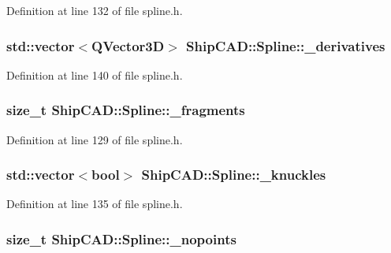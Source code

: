 Definition at line 132 of file spline.\-h.

\hypertarget{classShipCAD_1_1Spline_a8478f85abd680e3caee34dc230eed3e7}{
\subsubsection[{\-\_\-derivatives}]{\setlength{\rightskip}{0pt plus 5cm}std\-::vector$<$Q\-Vector3\-D$>$ Ship\-C\-A\-D\-::\-Spline\-::\-\_\-derivatives\hspace{0.3cm}{\ttfamily [protected]}}}\label{classShipCAD_1_1Spline_a8478f85abd680e3caee34dc230eed3e7}


Definition at line 140 of file spline.\-h.

\hypertarget{classShipCAD_1_1Spline_ac12e47ffb75b6d84877f849d18323622}{
\subsubsection[{\-\_\-fragments}]{\setlength{\rightskip}{0pt plus 5cm}size\-\_\-t Ship\-C\-A\-D\-::\-Spline\-::\-\_\-fragments\hspace{0.3cm}{\ttfamily [protected]}}}\label{classShipCAD_1_1Spline_ac12e47ffb75b6d84877f849d18323622}


Definition at line 129 of file spline.\-h.

\hypertarget{classShipCAD_1_1Spline_ac7d024ce90642d78587bc921efde009c}{
\subsubsection[{\-\_\-knuckles}]{\setlength{\rightskip}{0pt plus 5cm}std\-::vector$<$bool$>$ Ship\-C\-A\-D\-::\-Spline\-::\-\_\-knuckles\hspace{0.3cm}{\ttfamily [protected]}}}\label{classShipCAD_1_1Spline_ac7d024ce90642d78587bc921efde009c}


Definition at line 135 of file spline.\-h.

\hypertarget{classShipCAD_1_1Spline_a94ae8704ab2cae5ba6bb915e3df2e98d}{
\subsubsection[{\-\_\-nopoints}]{\setlength{\rightskip}{0pt plus 5cm}size\-\_\-t Ship\-C\-A\-D\-::\-Spline\-::\-\_\-nopoints\hspace{0.3cm}{\ttfamily [protected]}}}\label{classShipCAD_1_1Spline_a94ae8704ab2cae5ba6bb915e3df2e98d}


